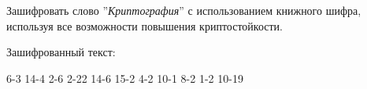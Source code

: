 \begin{problem}
  Зашифровать слово ''\textit{Криптография}'' с использованием книжного шифра,
  используя все возможности повышения криптостойкости.
\end{problem}

\begin{solution}
  Зашифрованный текст:
  \begin{addmargin}[2cm]{1cm}
    6-3 14-4 2-6 2-22 14-6 15-2 4-2 10-1 8-2 1-2 10-19
  \end{addmargin}
\end{solution}

